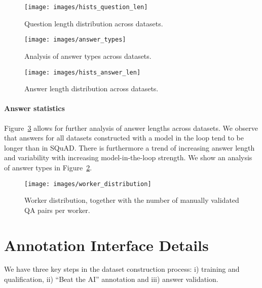 \documentclass[11pt,a4paper]{article}
\newcommand{\squad}{SQuAD}
\begin{document}
\begin{figure}[t]
        \centering
        \texttt{[image: images/hists\_question\_len]}
        \caption{Question length distribution across datasets.} 
        \label{fig:hists_question_len}
    \end{figure}


\begin{figure}[t]
        \centering
        \texttt{[image: images/answer\_types]}
        \caption{Analysis of answer types across datasets.} 
        \label{fig:answer_types}
    \end{figure}


\begin{figure}[t]
        \centering
        \texttt{[image: images/hists\_answer\_len]}
        \caption{Answer length distribution across datasets.} 
        \label{fig:hists_answer_len}
    \end{figure}


    \paragraph{Answer statistics}{
    Figure~\ref{fig:hists_answer_len} allows for further analysis of answer lengths across datasets.
We observe that answers for all datasets constructed with a model in the loop tend to be longer than in \squad{}.
There is furthermore a trend of increasing answer length and variability with increasing model-in-the-loop strength. 
We show an analysis of answer types in Figure~\ref{fig:answer_types}.
    }
    
    
\begin{figure*}[t]
        \centering
        \texttt{[image: images/worker\_distribution]}
        \caption{Worker distribution, together with the number of manually validated QA pairs per worker.} 
        \label{fig:worker_distribution}
    \end{figure*}


    \section{Annotation Interface Details}
    \label{sec:appendix_dataset_construction}
    
    We have three key steps in the dataset construction process: i) training and qualification, ii) ``Beat the AI'' annotation and iii) answer validation.
    
\end{document}
